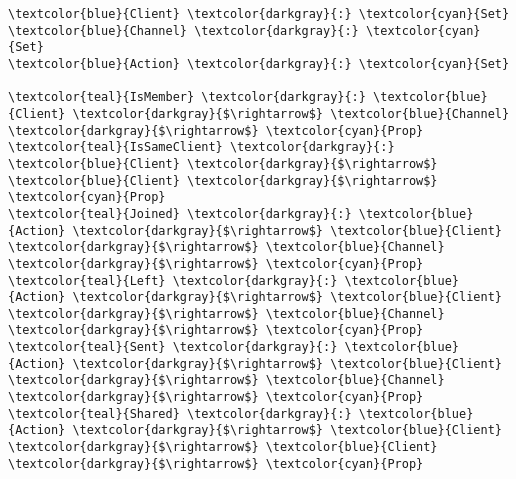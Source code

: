 \begin{Verbatim}[commandchars=\\\{\},codes={\catcode`$=3}]
\textcolor{blue}{Client} \textcolor{darkgray}{:} \textcolor{cyan}{Set}
\textcolor{blue}{Channel} \textcolor{darkgray}{:} \textcolor{cyan}{Set}
\textcolor{blue}{Action} \textcolor{darkgray}{:} \textcolor{cyan}{Set}

\textcolor{teal}{IsMember} \textcolor{darkgray}{:} \textcolor{blue}{Client} \textcolor{darkgray}{$\rightarrow$} \textcolor{blue}{Channel} \textcolor{darkgray}{$\rightarrow$} \textcolor{cyan}{Prop}
\textcolor{teal}{IsSameClient} \textcolor{darkgray}{:} \textcolor{blue}{Client} \textcolor{darkgray}{$\rightarrow$} \textcolor{blue}{Client} \textcolor{darkgray}{$\rightarrow$} \textcolor{cyan}{Prop}
\textcolor{teal}{Joined} \textcolor{darkgray}{:} \textcolor{blue}{Action} \textcolor{darkgray}{$\rightarrow$} \textcolor{blue}{Client} \textcolor{darkgray}{$\rightarrow$} \textcolor{blue}{Channel} \textcolor{darkgray}{$\rightarrow$} \textcolor{cyan}{Prop}
\textcolor{teal}{Left} \textcolor{darkgray}{:} \textcolor{blue}{Action} \textcolor{darkgray}{$\rightarrow$} \textcolor{blue}{Client} \textcolor{darkgray}{$\rightarrow$} \textcolor{blue}{Channel} \textcolor{darkgray}{$\rightarrow$} \textcolor{cyan}{Prop}
\textcolor{teal}{Sent} \textcolor{darkgray}{:} \textcolor{blue}{Action} \textcolor{darkgray}{$\rightarrow$} \textcolor{blue}{Client} \textcolor{darkgray}{$\rightarrow$} \textcolor{blue}{Channel} \textcolor{darkgray}{$\rightarrow$} \textcolor{cyan}{Prop}
\textcolor{teal}{Shared} \textcolor{darkgray}{:} \textcolor{blue}{Action} \textcolor{darkgray}{$\rightarrow$} \textcolor{blue}{Client} \textcolor{darkgray}{$\rightarrow$} \textcolor{blue}{Client} \textcolor{darkgray}{$\rightarrow$} \textcolor{cyan}{Prop}


\end{Verbatim}
